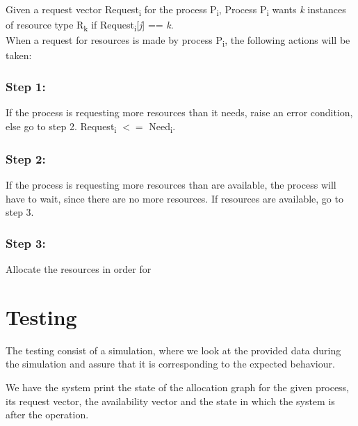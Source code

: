 Given a request vector Request\textsubscript{i} for the process P\textsubscript{i}, Process P\textsubscript{i} wants \textit{k} instances of resource type R\textsubscript{k} if Request\textsubscript{i}[\textit{j}] == \textit{k}.\\

When a request for resources is made by process P\textsubscript{i}, the following actions will be taken:

\subsubsection{Step 1:}
If the process is requesting more resources than it needs, raise an error condition, else go to step 2. Request\textsubscript{i} $<=$ Need\textsubscript{i}.

\subsubsection{Step 2:}
If the process is requesting more resources than are available, the process will have to wait, since there are no more resources. If resources are available, go to step 3.

\subsubsection{Step 3:}
Allocate the resources in order for 

\section{Testing}
The testing consist of a simulation, where we look at the provided data during the simulation and assure that it is corresponding to the expected behaviour.

We have the system print the state of the allocation graph for the given process, its request vector, the availability vector and the state in which the system is after the operation.